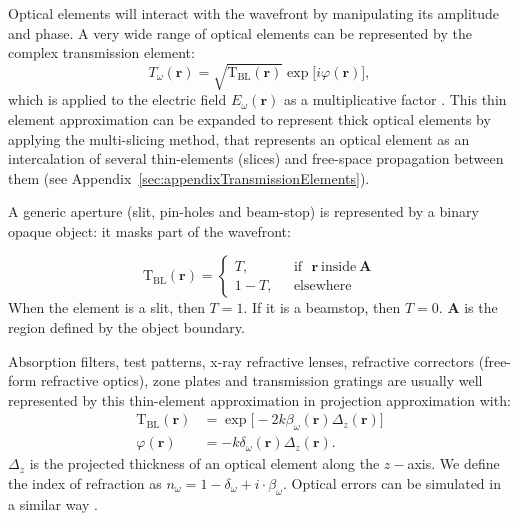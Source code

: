 \documentclass{iucr}              %
\begin{document}
Optical elements will interact with the wavefront by manipulating its amplitude and phase. A very wide range of optical elements can be represented by the complex transmission element:
 \begin{equation}\label{eq:trans_el}
T_\omega(\textbf{r})=\sqrt{\mathrm{T}_\mathrm{BL}(\textbf{r})}\exp{\big[ i\varphi(\textbf{r})\big]},
\end{equation}
which is applied to the electric field $E_\omega(\textbf{r})$ as a multiplicative factor \cite{Cloetens_1996}. This thin element approximation can be expanded to represent thick optical elements by applying the multi-slicing method, that represents an optical element as an intercalation of several thin-elements (slices) and free-space propagation between them \cite{paganin_book, Li2017, Munro2019} (see Appendix~\ref{sec:appendixTransmissionElements}). 

A generic aperture (slit, pin-holes and beam-stop) is represented by a binary opaque object: it masks part of the wavefront:

\begin{equation}
\mathrm{T}_{\text{BL}}(\textbf{r}) =
\left\{
\begin{matrix}
T,  & \mbox{~~if~~}  \textbf{r}~\text{inside}~ \textbf{A}
\\ 
1 - T, & \mbox{~~elsewhere}
\end{matrix}
\right.
\end{equation}
When the element is a slit, then $T=1$. If it is a beamstop, then $T=0$. $\textbf{A}$ is the region defined by the object boundary. 

Absorption filters, test patterns, x-ray refractive lenses, refractive correctors (free-form refractive optics), zone plates and transmission gratings are usually well represented by this thin-element approximation in projection approximation with:
\begin{subequations}
\begin{align}   
    \mathrm{T}_{\text{BL}}(\textbf{r})&=\exp{\big[-2k\beta_\omega(\textbf{r})\Delta_z(\textbf{r})\big]}\label{eq:aux_funcs_transa}  \\
    \varphi(\textbf{r})&=-k\delta_\omega(\textbf{r})\Delta_z(\textbf{r}).\label{eq:aux_funcs_transb}
\end{align}
\end{subequations}
$\Delta_z$ is the projected thickness of an optical element along the $z-$axis. We define the index of refraction as $n_\omega=1-\delta_\omega+i\cdot\beta_\omega$. Optical errors can be simulated in a similar way \cite{Laundy2014,Celestre:mo5214,srioLBL}.
\end{document}
